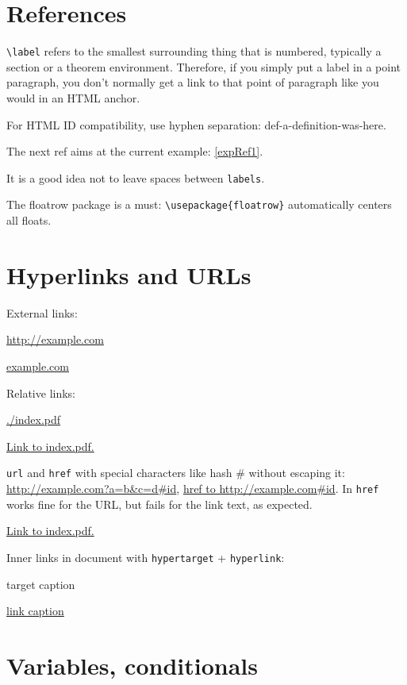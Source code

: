 \documentclass[12pt]{article}
\begin{document}
\section{References}\label{references}

  \lstinline|\label| refers to the smallest surrounding thing that is numbered, typically a section or a theorem environment. Therefore, if you simply put a label in a point paragraph, you don't normally get a link to that point of paragraph like you would in an HTML anchor.

  For HTML ID compatibility, use hyphen separation: def-a-definition-was-here.

  \begin{example}\label{expRef1}
    The next ref aims at the current example: \ref{expRef1}.
  \end{example}

  It is a good idea not to leave spaces between \lstinline|labels|.

  The floatrow package is a must: \lstinline|\usepackage{floatrow}| automatically centers all floats.

\section{Hyperlinks and URLs}\label{hyperlinks-urls}

  External links:

  \url{http://example.com}

  \href{http://example.com}{example.com}

  Relative links:

  \url{./index.pdf}

  \href{./index.pdf}{Link to index.pdf.}

  \lstinline|url| and \lstinline|href| with special characters like hash \# without escaping it: \url{http://example.com?a=b&c=d#id}, \href{http://example.com?a=b&c=d#id}{href to http://example.com\#id}. In \lstinline|href| works fine for the URL, but fails for the link text, as expected.

  \href{./index.pdf}{Link to index.pdf.}

  Inner links in document with \lstinline|hypertarget| + \lstinline|hyperlink|:

  \hypertarget{label}{target caption}

  \hyperlink{label}{link caption}

\section{Variables, conditionals}\label{variables}
\end{document}
